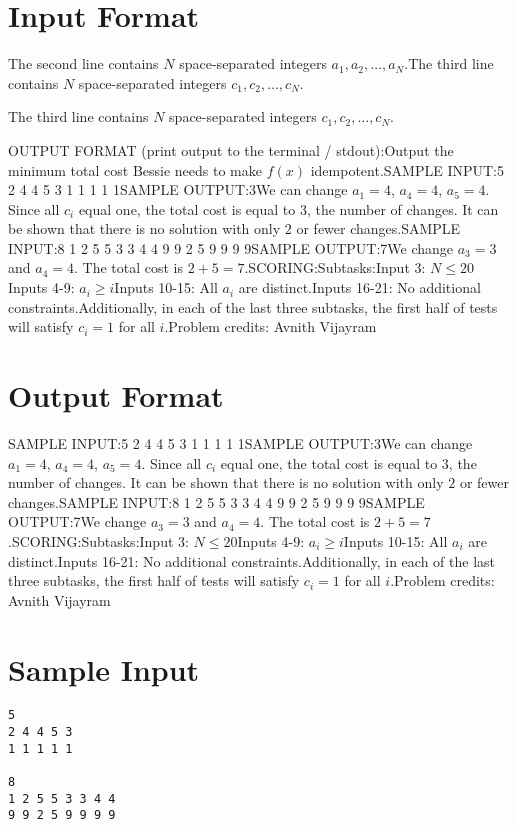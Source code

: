 \documentclass[12pt]{article}
\begin{document}
\section*{Input Format}
The second line contains $N$ space-separated integers $a_1,a_2,\dots,a_N$.The third line contains $N$ space-separated integers $c_1,c_2,\dots,c_N$.

The third line contains $N$ space-separated integers $c_1,c_2,\dots,c_N$.

OUTPUT FORMAT (print output to the terminal / stdout):Output the minimum total cost Bessie needs to make $f(x)$ idempotent.SAMPLE INPUT:5
2 4 4 5 3
1 1 1 1 1SAMPLE OUTPUT:3We can change $a_1 = 4$, $a_4 = 4$, $a_5 = 4$. Since all $c_i$ equal one, the
total cost is equal to $3$, the number of changes. It can be shown that there is
no solution with only $2$ or fewer changes.SAMPLE INPUT:8
1 2 5 5 3 3 4 4
9 9 2 5 9 9 9 9SAMPLE OUTPUT:7We change $a_3 = 3$ and $a_4 = 4$. The total cost is $2+5=7$.SCORING:Subtasks:Input 3: $N\le 20$Inputs 4-9: $a_i\ge i$Inputs 10-15: All $a_i$ are distinct.Inputs 16-21: No additional constraints.Additionally, in each of the last three subtasks, the first half of tests  will
satisfy $c_i=1$ for all $i$.Problem credits: Avnith Vijayram

\section*{Output Format}
SAMPLE INPUT:5
2 4 4 5 3
1 1 1 1 1SAMPLE OUTPUT:3We can change $a_1 = 4$, $a_4 = 4$, $a_5 = 4$. Since all $c_i$ equal one, the
total cost is equal to $3$, the number of changes. It can be shown that there is
no solution with only $2$ or fewer changes.SAMPLE INPUT:8
1 2 5 5 3 3 4 4
9 9 2 5 9 9 9 9SAMPLE OUTPUT:7We change $a_3 = 3$ and $a_4 = 4$. The total cost is $2+5=7$.SCORING:Subtasks:Input 3: $N\le 20$Inputs 4-9: $a_i\ge i$Inputs 10-15: All $a_i$ are distinct.Inputs 16-21: No additional constraints.Additionally, in each of the last three subtasks, the first half of tests  will
satisfy $c_i=1$ for all $i$.Problem credits: Avnith Vijayram

\section*{Sample Input}
\begin{verbatim}
5
2 4 4 5 3
1 1 1 1 1

8
1 2 5 5 3 3 4 4
9 9 2 5 9 9 9 9
\end{verbatim}
\end{document}
